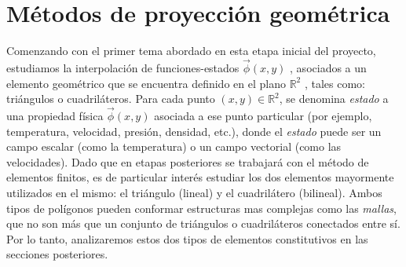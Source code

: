 \documentclass[informe.tex]{subfiles}
\begin{document}
\section{Métodos de proyección geométrica}
\label{sec:met_geo}
Comenzando con el primer tema abordado en esta etapa inicial del proyecto, estudiamos la interpolación de funciones-estados $\vec{ \phi } (x,y)$ , asociados a un elemento geométrico que se encuentra definido en el plano $\mathbb{R}^2$ , tales como: triángulos o cuadriláteros. Para cada punto $(x,y)\in \mathbb{R}^2$, se denomina \emph{estado} a una propiedad física $\vec{ \phi } (x,y)$ asociada a ese punto particular (por ejemplo, temperatura, velocidad, presión, densidad, etc.), donde el \emph{estado} puede ser un campo escalar (como la temperatura) o un campo vectorial (como las velocidades). Dado que en etapas posteriores se trabajará con el método de elementos finitos, es de particular interés estudiar los dos elementos mayormente utilizados en el mismo: el triángulo (lineal) y el cuadrilátero (bilineal). Ambos tipos de polígonos pueden conformar estructuras mas complejas como las \emph{mallas}, que no son más que un conjunto de triángulos o cuadriláteros conectados entre sí. Por lo tanto, analizaremos estos dos tipos de elementos constitutivos en las secciones posteriores.
\end{document}
